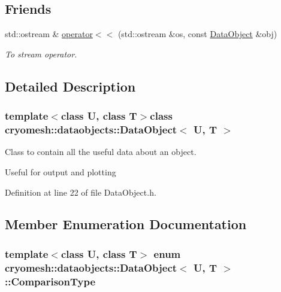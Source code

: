 \subsection*{\-Friends}
\begin{DoxyCompactItemize}
\item 
std\-::ostream \& \hyperlink{classcryomesh_1_1dataobjects_1_1DataObject_a71175025fe382ef063f84ad2281165aa}{operator$<$$<$} (std\-::ostream \&os, const \hyperlink{classcryomesh_1_1dataobjects_1_1DataObject}{\-Data\-Object} \&obj)
\begin{DoxyCompactList}\small\item\em \-To stream operator. \end{DoxyCompactList}\end{DoxyCompactItemize}


\subsection{\-Detailed \-Description}
\subsubsection*{template$<$class \-U, class \-T$>$class cryomesh\-::dataobjects\-::\-Data\-Object$<$ U, T $>$}

\-Class to contain all the useful data about an object. 

\-Useful for output and plotting 

\-Definition at line 22 of file \-Data\-Object.\-h.



\subsection{\-Member \-Enumeration \-Documentation}
\hypertarget{classcryomesh_1_1dataobjects_1_1DataObject_a88c071e82534aa8b82c336a8104f9df8}{
\subsubsection[{\-Comparison\-Type}]{\setlength{\rightskip}{0pt plus 5cm}template$<$class \-U, class \-T$>$ enum {\bf cryomesh\-::dataobjects\-::\-Data\-Object}$<$ \-U, \-T $>$\-::{\bf \-Comparison\-Type}}}\label{classcryomesh_1_1dataobjects_1_1DataObject_a88c071e82534aa8b82c336a8104f9df8}


